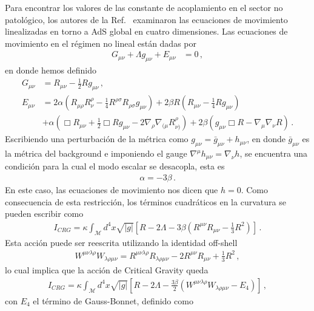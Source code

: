 \documentclass[../Main.tex]{subfiles}
\begin{document}
 Para encontrar los valores de las constante de acoplamiento en el sector no patológico, los autores de la  Ref.~\cite{Lu:2011ks} examinaron las ecuaciones de movimiento linealizadas en torno a AdS global en cuatro dimensiones. Las ecuaciones de movimiento en el régimen no lineal están dadas por
\begin{align}
    G_{\mu\nu}+\Lambda g_{\mu\nu}+E_{\mu\nu}&=0 \, ,
    \end{align}
en donde hemos definido
\begin{align}
    G_{\mu\nu}&=R_{\mu\nu}-\frac{1}{2}Rg_{\mu\nu}\,,\\
    E_{\mu\nu}&=2\alpha\left(R_{\mu\rho}R^{\rho}_{\nu}-\frac{1}{4}R^{\rho\sigma}R_{\rho\sigma}g_{\mu\nu}\right)+2\beta R\left(R_{\mu\nu}-\frac{1}{4}Rg_{\mu\nu}\right)\nonumber\\
    &+\alpha\left(\Box R_{\mu\nu}+\frac{1}{2}\Box Rg_{\mu\nu}-2\nabla_{\rho}\nabla_{(\mu}R_{\nu)}^{\rho}\right)+2\beta(g_{\mu\nu}\Box R-\nabla_{\mu}\nabla_{\nu}R)\,.
\end{align}
Escribiendo una perturbación de la métrica como $g_{\mu\nu}=\bar{g}_{\mu\nu}+h_{\mu\nu}$, en donde $\bar{g}_{\mu\nu}$ es la métrica del background e imponiendo el gauge $\nabla^{\mu}h_{\mu\nu}=\nabla_{\nu}h$, se encuentra una condición para la cual el modo escalar se desacopla, esta es
\begin{align}
    \alpha=-3\beta \, . \label{CCG}
\end{align}
En este caso, las ecuaciones de movimiento nos dicen que $h=0$. Como consecuencia de esta restricción, los términos cuadráticos  en la curvatura se pueden escribir como 
\begin{align}
     I_{CRG} = \kappa\int_{\mathcal{M}} d^{4}x \sqrt{\lvert g\rvert} \left[R-2\Lambda  -3\beta\left(R^{\mu\nu}R_{\mu\nu}-\frac{1}{3}R^2\right)\right] \, .
\end{align}
Esta acción puede ser reescrita utilizando la identidad off-shell 
\begin{align}
    W^{\mu\nu\lambda\rho}W_{\lambda\rho\mu\nu}=R^{\mu\nu\lambda\rho}R_{\lambda\rho\mu\nu}-2R^{\mu\nu}R_{\mu\nu}+\frac{1}{3}R^2 \, ,
\end{align}
lo cual implica que la acción de Critical Gravity queda
\begin{align}
       I_{CRG} = \kappa\int_{\mathcal{M}} d^{4}x \sqrt{\lvert g\rvert} \left[R-2\Lambda  -\frac{3\beta}{2}\left(W^{\mu\nu\lambda\rho}W_{\lambda\rho\mu\nu}-E_4\right)\right] \, ,
\end{align}
con $E_{4}$ el término de Gauss-Bonnet, definido como
\end{document}

